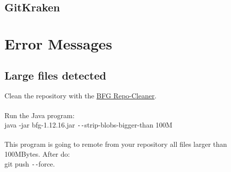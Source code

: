 \subsection{GitKraken}

\section{Error Messages}

\subsection{Large files detected}

Clean the repository with the \href{https://rtyley.github.io/bfg-repo-cleaner}{BFG Repo-Cleaner}.\\
\\
Run the Java program:\\

java -jar bfg-1.12.16.jar \texttt{-{}-}strip-blobs-bigger-than 100M\\
\\
This program is going to remote from your repository all files larger than 100MBytes. After do:\\

git push \texttt{-{}-}force.
